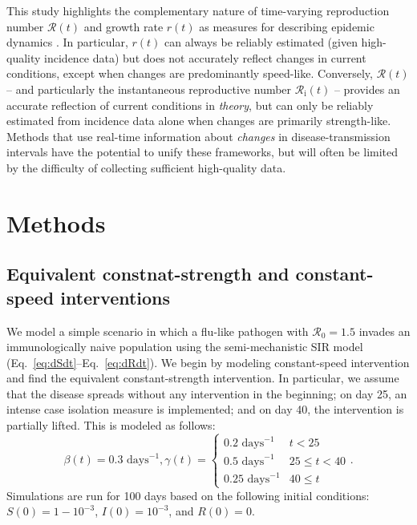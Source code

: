 \documentclass[12pt]{article}
\newcommand{\eref}[1]{Eq.~\ref{eq:#1}}
\newcommand{\Rx}[1]{\ensuremath{{\mathcal R}_{#1}}\xspace}
\newcommand{\Ro}{\Rx{0}}
\newcommand{\Ri}{\Rx{\mathrm{i}}}
\newcommand{\RR}{\ensuremath{{\mathcal R}}\xspace}
\begin{document}
This study highlights the complementary nature of time-varying reproduction number $\RR(t)$ and growth rate $r(t)$ as measures for describing epidemic dynamics \citep{dushoff2021speed}.
In particular, $r(t)$ can always be reliably estimated (given high-quality incidence data) but does not accurately reflect changes in current conditions, except when changes are predominantly speed-like.
Conversely, $\RR(t)$ -- and particularly the instantaneous reproductive number $\Ri(t)$ -- provides an accurate reflection of current conditions in \emph{theory}, but can only be reliably estimated from incidence data alone when changes are primarily strength-like.
Methods that use real-time information about \emph{changes} in disease-transmission intervals have the potential to unify these frameworks, but will often be limited by the difficulty of collecting sufficient high-quality data.

\section{Methods}

\subsection{Equivalent constnat-strength and constant-speed interventions}

We model a simple scenario in which a flu-like pathogen with $\Ro = 1.5$ invades an immunologically naive population using the semi-mechanistic SIR model (\eref{dSdt}--\eref{dRdt}).
We begin by modeling constant-speed intervention and find the equivalent constant-strength intervention.  
In particular, we assume that the disease spreads without any intervention in the beginning;
on day 25, an intense case isolation measure is implemented; and
on day 40, the intervention is partially lifted.
This is modeled as follows:
\begin{equation}
\beta(t) = 0.3\,\,\textrm{days}^{-1}, \gamma(t) = \begin{cases}
0.2\,\, \textrm{days}^{-1} & t < 25\\
0.5\,\, \textrm{days}^{-1} & 25 \leq t < 40 \\
0.25\,\, \textrm{days}^{-1} & 40 \leq t
\end{cases}.
\end{equation}
Simulations are run for 100 days based on the following initial conditions: $S(0) = 1 - 10^{-3}$, $I(0) = 10^{-3}$, and $R(0) = 0$.
\end{document}
